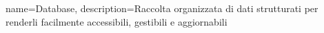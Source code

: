 {
	name={Database},
	description={Raccolta organizzata di dati strutturati per renderli facilmente accessibili, gestibili e aggiornabili}
}